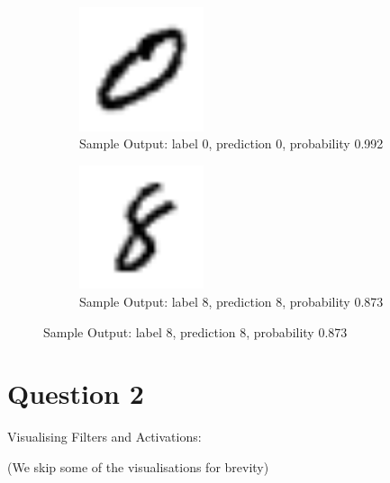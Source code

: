 \begin{figure}[h]
\begin{subfigure}
\centering
\includegraphics[angle=0,width=0.4\textwidth]{assign-2/logs/0.png}
\caption{Sample Output: label 0, prediction 0, probability 0.992}
\end{subfigure}
\begin{subfigure}
\centering
\includegraphics[angle=0,width=0.4\textwidth]{assign-2/logs/8.png}
\caption{Sample Output: label 8, prediction 8, probability 0.873}
\end{subfigure}
\end{figure}

\section{Question 2}

Visualising Filters and Activations:

(We skip some of the visualisations for brevity)


